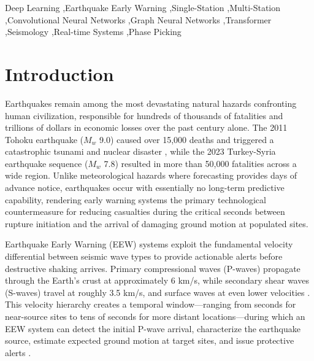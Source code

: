 \documentclass[review,authoryear]{elsarticle}
\begin{document}
\begin{frontmatter}
\begin{abstract}
\end{abstract}

\begin{keyword}
Deep Learning \sep Earthquake Early Warning \sep Single-Station \sep Multi-Station \sep Convolutional Neural Networks \sep Graph Neural Networks \sep Transformer \sep Seismology \sep Real-time Systems \sep Phase Picking
\end{keyword}

\end{frontmatter}

\newpage

\section{Introduction}
\label{sec:introduction}

Earthquakes remain among the most devastating natural hazards confronting human civilization, responsible for hundreds of thousands of fatalities and trillions of dollars in economic losses over the past century alone. The 2011 Tohoku earthquake ($M_w$ 9.0) caused over 15,000 deaths and triggered a catastrophic tsunami and nuclear disaster \citep{simons2011decade}, while the 2023 Turkey-Syria earthquake sequence ($M_w$ 7.8) resulted in more than 50,000 fatalities across a wide region. Unlike meteorological hazards where forecasting provides days of advance notice, earthquakes occur with essentially no long-term predictive capability, rendering early warning systems the primary technological countermeasure for reducing casualties during the critical seconds between rupture initiation and the arrival of damaging ground motion at populated sites.

Earthquake Early Warning (EEW) systems exploit the fundamental velocity differential between seismic wave types to provide actionable alerts before destructive shaking arrives. Primary compressional waves (P-waves) propagate through the Earth's crust at approximately 6 km/s, while secondary shear waves (S-waves) travel at roughly 3.5 km/s, and surface waves at even lower velocities \citep{aki1980quantitative}. This velocity hierarchy creates a temporal window---ranging from seconds for near-source sites to tens of seconds for more distant locations---during which an EEW system can detect the initial P-wave arrival, characterize the earthquake source, estimate expected ground motion at target sites, and issue protective alerts \citep{allen2003potential, kanamori2005realtime}.
\end{document}
